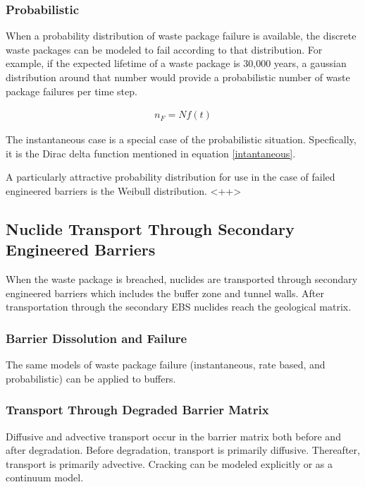 \subsubsection{Probabilistic}

When a probability distribution of waste package failure is available, the 
discrete waste packages can be modeled to fail according to that distribution. 
For example, if the expected lifetime of a waste package is 30,000 years, a 
gaussian distribution around that number would provide a probabilistic number of 
waste package failures per time step. 

\begin{align}
  n_F=Nf(t)
  \label{probabilistic}
\end{align}

The instantaneous case is a special case of the probabilistic situation. 
Specfically, it is the Dirac delta function mentioned in equation 
\eqref{intantaneous}.

A particularly attractive probability distribution for use in the case of failed 
engineered barriers is the Weibull distribution. <++>


\subsection{Nuclide Transport Through Secondary Engineered Barriers}

When the waste package is breached, nuclides are transported through secondary 
engineered barriers which includes the buffer zone and tunnel walls. After 
transportation through the secondary EBS nuclides reach the geological matrix. 

\subsubsection{Barrier Dissolution and Failure}

The same models of waste package failure (instantaneous, rate based, and 
probabilistic) can be applied to buffers.

\subsubsection{Transport Through Degraded Barrier Matrix}

Diffusive and advective transport occur in the barrier matrix both before and 
after degradation. Before degradation, transport is primarily diffusive. 
Thereafter, transport is primarily advective. Cracking can be modeled explicitly 
or as a continuum model.  

